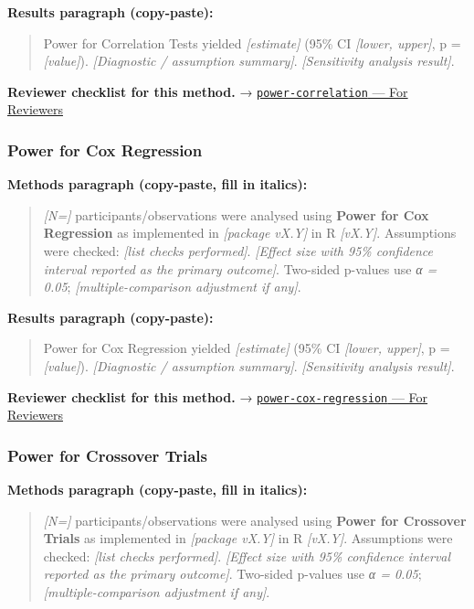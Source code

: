 \documentclass[
]{article}
\begin{document}
\textbf{Results paragraph (copy-paste):}

\begin{quote}
Power for Correlation Tests yielded \emph{{[}estimate{]}} (95\% CI
\emph{{[}lower, upper{]}}, p = \emph{{[}value{]}}). \emph{{[}Diagnostic
/ assumption summary{]}}. \emph{{[}Sensitivity analysis result{]}}.
\end{quote}

\textbf{Reviewer checklist for this method.} →
\href{../chapters/05-power/power-correlation.Rmd\#for-reviewers}{\texttt{power-correlation}
--- For Reviewers}

\subsubsection{Power for Cox Regression}\label{power-for-cox-regression}

\textbf{Methods paragraph (copy-paste, fill in italics):}

\begin{quote}
\emph{{[}N={]}} participants/observations were analysed using
\textbf{Power for Cox Regression} as implemented in \emph{{[}package
vX.Y{]}} in R \emph{{[}vX.Y{]}}. Assumptions were checked: \emph{{[}list
checks performed{]}}. \emph{{[}Effect size with 95\% confidence interval
reported as the primary outcome{]}}. Two-sided p-values use \emph{α =
0.05}; \emph{{[}multiple-comparison adjustment if any{]}}.
\end{quote}

\textbf{Results paragraph (copy-paste):}

\begin{quote}
Power for Cox Regression yielded \emph{{[}estimate{]}} (95\% CI
\emph{{[}lower, upper{]}}, p = \emph{{[}value{]}}). \emph{{[}Diagnostic
/ assumption summary{]}}. \emph{{[}Sensitivity analysis result{]}}.
\end{quote}

\textbf{Reviewer checklist for this method.} →
\href{../chapters/05-power/power-cox-regression.Rmd\#for-reviewers}{\texttt{power-cox-regression}
--- For Reviewers}

\subsubsection{Power for Crossover
Trials}\label{power-for-crossover-trials}

\textbf{Methods paragraph (copy-paste, fill in italics):}

\begin{quote}
\emph{{[}N={]}} participants/observations were analysed using
\textbf{Power for Crossover Trials} as implemented in \emph{{[}package
vX.Y{]}} in R \emph{{[}vX.Y{]}}. Assumptions were checked: \emph{{[}list
checks performed{]}}. \emph{{[}Effect size with 95\% confidence interval
reported as the primary outcome{]}}. Two-sided p-values use \emph{α =
0.05}; \emph{{[}multiple-comparison adjustment if any{]}}.
\end{quote}
\end{document}
